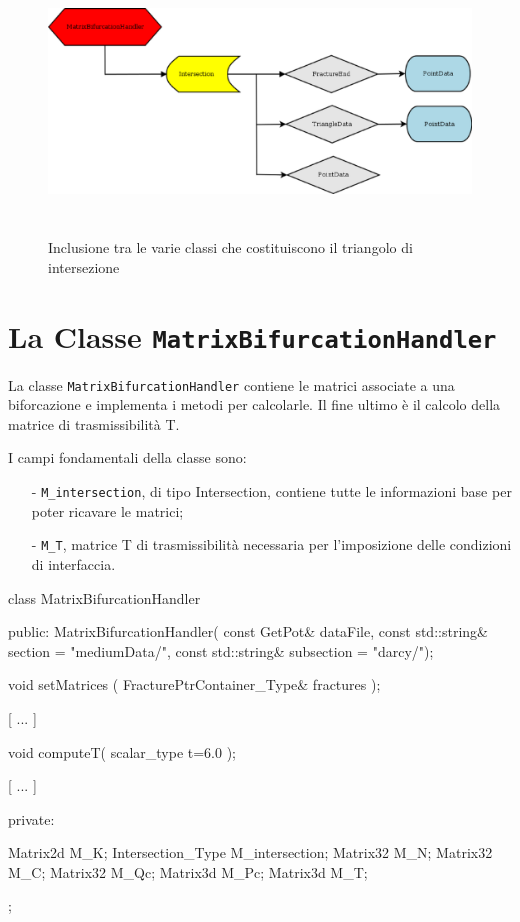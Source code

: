 \newpage
\begin{figure}[htbp]
\centering
\includegraphics[height=7cm, width=1\textwidth]{img/subcap3_3/MatrixBifurcationHandler2.eps}
\caption{Inclusione tra le varie classi che costituiscono il triangolo di intersezione}\label{Inclusione classi MatrixBifurcationHandler}
\end{figure}

\section{La Classe \texttt{MatrixBifurcationHandler}}
La classe \texttt{MatrixBifurcationHandler} contiene le matrici associate a una biforcazione e implementa i metodi per calcolarle.  Il fine ultimo è il calcolo della matrice di trasmissibilità T.

\noindent I campi fondamentali della classe sono:
	\begin{enumerate}
	\item[-] \texttt{M\_intersection}, di tipo Intersection, contiene tutte le informazioni base per poter ricavare le matrici;
	\item[-] \texttt{M\_T}, matrice T di trasmissibilità necessaria per l'imposizione delle condizioni di interfaccia.
	\end{enumerate} 
\begin{Code03_03}[caption={Classe \texttt{Intersection}}]
class MatrixBifurcationHandler
{
 public:
	MatrixBifurcationHandler( const GetPot& dataFile,
				const std::string& section = "mediumData/",
				const std::string& subsection = "darcy/");
	
	void setMatrices ( FracturePtrContainer_Type& fractures );
	
	[ ... ]
	
	void computeT( scalar_type t=6.0 );

	[ ... ]

 private:

	Matrix2d M_K;
	Intersection_Type M_intersection;
	Matrix32 M_N;
	Matrix32 M_C;
	Matrix32 M_Qc;
	Matrix3d M_Pc;
	Matrix3d M_T;
};
\end{Code03_03}

